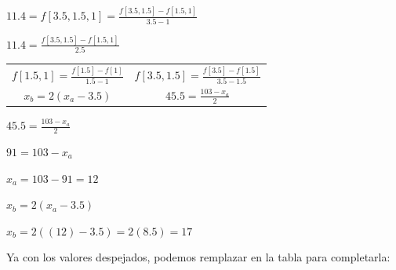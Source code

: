 \documentclass[english,notitlepage,letterpaper, 10pt]{article} %
\begin{document}
\begin{enumerate}
\begin{enumerate}
      \begin{center}
        \begin{math}
          11.4 = f[3.5,1.5,1] = \displaystyle \frac{f[3.5,1.5]-f[1.5,1]}{3.5 - 1}
        \end{math}

        \begin{math}
          11.4 = \displaystyle \frac{f[3.5,1.5]-f[1.5,1]}{2.5}
        \end{math}

        \begin{table}[H]
          \centering
          \begin{tabular}{cc}
            $ f[1.5,1] = \displaystyle \frac{f[1.5]-f[1]}{1.5-1}$ & $ f[3.5,1.5] = \displaystyle \frac{f[3.5]-f[1.5]}{3.5-1.5}$ \\ 
            $x_b = \displaystyle 2(x_a-3.5)$ & $ 45.5 = \displaystyle \frac{103-x_a}{2} $ \\
          \end{tabular}
        \end{table}

        \begin{math}
          45.5 = \frac{103-x_a}{2}
        \end{math}

        \begin{math}
          91 = 103 - x_a
        \end{math}

        \begin{math}
          x_a = 103 - 91 = 12
        \end{math}

        \begin{math}
          x_b = \displaystyle 2(x_a-3.5)
        \end{math}

        \begin{math}
          x_b = 2((12)-3.5) = 2(8.5) = 17
        \end{math}

      \end{center}

      Ya con los valores despejados, podemos remplazar en la tabla para completarla:

      \begin{center}
        \begin{table}[H]

          \centering
          \begin{tabular}{|p{1.5cm}|p{1.5cm}|p{1.5cm}|p{1.5cm}|p{1.5cm}|}
    

\end{tabular}
\end{table}
\end{center}
\end{enumerate}
\end{enumerate}
\end{document}
